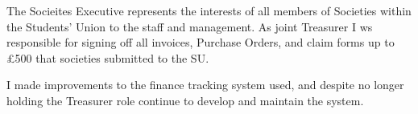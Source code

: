 The Socieites Executive represents the interests of all members of Societies within the Students' Union to the staff and management.
As joint Treasurer I ws responsible for signing off all invoices, Purchase Orders, and claim forms up to £500 that societies submitted to the SU.

I made improvements to the finance tracking system used, and despite no longer holding the Treasurer role continue to develop and maintain the system.
\sectionsep{}
